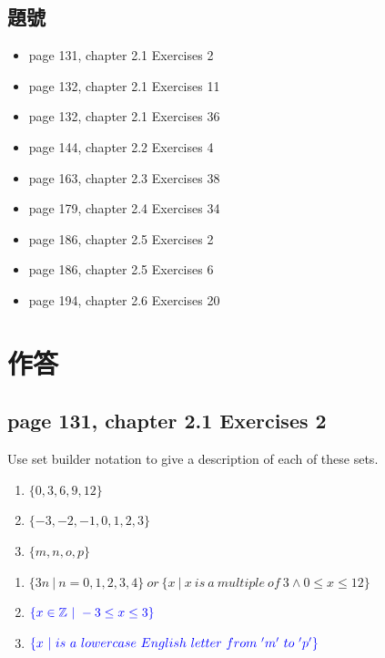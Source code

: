 \documentclass[sigconf]{acmart}
\newcommand{\answer}[2]{%
  \if\relax\detokenize{#2}\relax
    \underline{\mbox{請作答}}%
  \else
    \textcolor{blue}{#2}%
  \fi
}
\begin{document}
\subsection{題號}
\begin{shaded}
\begin{itemize}
        \item[-] page 131, chapter 2.1 Exercises 2
	\item[-] page 132, chapter 2.1 Exercises 11
        \item[-] page 132, chapter 2.1 Exercises 36
	\item[-] page 144, chapter 2.2 Exercises 4
	\item[-] page 163, chapter 2.3 Exercises 38
	\item[-] page 179, chapter 2.4 Exercises 34
	\item[-] page 186, chapter 2.5 Exercises 2
 	\item[-] page 186, chapter 2.5 Exercises 6
  	\item[-] page 194, chapter 2.6 Exercises 20
\end{itemize}
\end{shaded}

\section{作答}
\subsection{page 131, chapter 2.1 Exercises 2}
\begin{shaded}
    Use set builder notation to give a description of each of these sets.
    \begin{enumerate}[label=(\alph*)]
    	\item $\{0, 3, 6, 9, 12\}$
    	\item $\{-3,-2,-1, 0, 1, 2, 3\}$
            \item $\{m, n, o, p\}$
    \end{enumerate}
\end{shaded}  
\begin{enumerate}[label=(\alph*)]
	\item $\{3n\ |\ n = 0, 1, 2, 3, 4\}\ or\ \{x\ |\ x\ is\ a\ multiple\ of\ 3\wedge 0\le x\le 12\}$
	\item $\answer{@2.1.2b}{\{x \in \mathbb{Z}\ | \ -3 \leq x \leq 3\}}$
    \item $\answer{@2.1.2c}{\{x \ | \ is\ a\ lowercase\ English\ letter\ from\ 'm'\ to\ 'p'\}}$
\end{enumerate}
\end{document}
